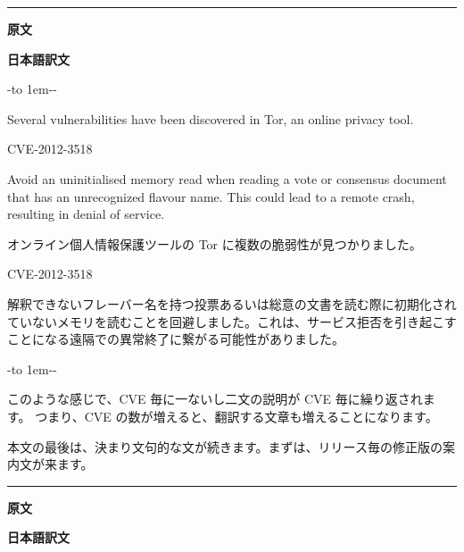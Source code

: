 \documentclass[mingoth,a4paper]{jsarticle}
\begin{document}
\vspace{1ex}
\pagebreak[2]
\clearpage

\hrule
{}\par
\parbox[t]{0.48\linewidth}{{\bf 原文}}\hfil \parbox{0.48\linewidth}{\bf 日本語訳文}\par\vspace{0.1em}

-\leaders\hbox to 1em{\hss{}-\hss}\hfill -\par
\parbox[t]{0.47\linewidth}{
Several vulnerabilities have been discovered in Tor, an online privacy
tool.

\begin{list}{}{\setlength{\labelwidth}{16ex}\setlength{\labelsep}{1ex}
\setlength{\leftmargin}{8ex}\setlength{\itemindent}{4em}}
\item[CVE-2012-3518]\hfil\par

  Avoid an uninitialised memory read when reading a vote or consensus  document that has an unrecognized flavour name. This could lead to a remote crash, resulting in denial of service.
\end{list}
}\hfil
\parbox[t]{0.47\linewidth}{
オンライン個人情報保護ツールの Tor に複数の脆弱性が見つかりました。

\begin{list}{}{\setlength{\labelwidth}{16ex}\setlength{\labelsep}{1ex}
\setlength{\leftmargin}{8ex}\setlength{\itemindent}{4em}}
\item[CVE-2012-3518]\hfil\par

  解釈できないフレーバー名を持つ投票あるいは総意の文書を読む際に初期化されていないメモリを読むことを回避しました。これは、サービス拒否を引き起こすことになる遠隔での異常終了に繋がる可能性がありました。
\end{list}
}\hfil

-\leaders\hbox to 1em{\hss{}-\hss}\hfill -\par

\vspace{1em}\par

このような感じで、CVE 毎に一ないし二文の説明が CVE 毎に繰り返されます。
つまり、CVE の数が増えると、翻訳する文章も増えることになります。

本文の最後は、決まり文句的な文が続きます。まずは、リリース毎の修正版の案内文が来ます。

\vspace{1ex}
\pagebreak[2]
\hrule
{}\par
\parbox[t]{0.47\linewidth}{{\bf 原文}}\hfil \parbox{0.48\linewidth}{\bf 日本語訳文}\par\vspace{0.1em}
\end{document}

